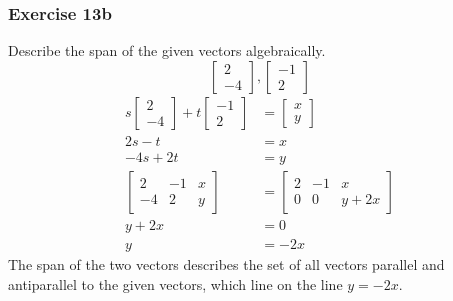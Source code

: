 \documentclass[letterpaper, 12pt]{math}
\begin{document}
\subsubsection*{Exercise 13b}
Describe the span of the given vectors algebraically.
\[ \begin{bmatrix}2 \\ -4\end{bmatrix},\begin{bmatrix}-1 \\ 2\end{bmatrix} \]
\begin{align*}
  s\begin{bmatrix}2 \\ -4\end{bmatrix}+t\begin{bmatrix}-1 \\ 2\end{bmatrix} &=
    \begin{bmatrix}x \\ y\end{bmatrix} \\
  2s-t &= x\\
  -4s+2t &= y \\
  \begin{bmatrix}
    2 & -1 & x \\
    -4 & 2 & y
  \end{bmatrix} &= \begin{bmatrix}
    2 & -1 & x \\
    0 & 0 & y+2x
  \end{bmatrix} \\
  y+2x &= 0 \\
  y &= -2x
\end{align*}
The span of the two vectors describes the set of all vectors parallel and
antiparallel to the given vectors, which line on the line \( y = -2x \).
\end{document}
